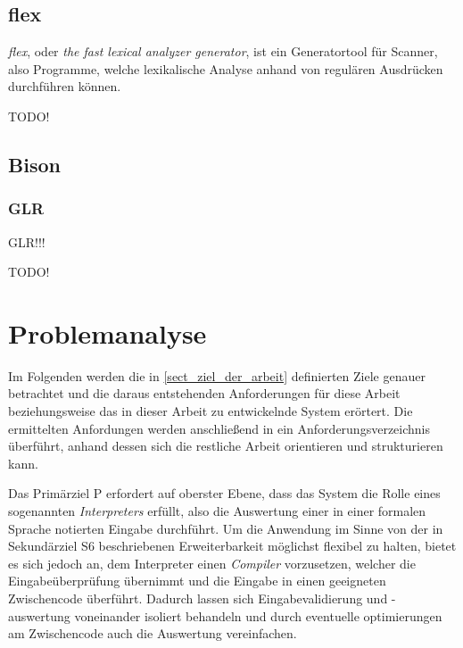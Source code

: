 \documentclass[oneside]{ausarbeitung}
\begin{document}
	\section{flex}
	
	\textit{flex}, oder \textit{the fast lexical analyzer generator}, ist ein Generatortool für Scanner, also Programme, welche lexikalische Analyse anhand von regulären Ausdrücken durchführen können. 
	
	TODO!
	
	
	\section{Bison}
	
	\subsection{GLR}
	
	
	GLR!!!
	
	TODO!

	
	
	
	
	\chapter{Problemanalyse}
	\label{chapt_problemanalyse}
	
	Im Folgenden werden die in \ref{sect_ziel_der_arbeit} definierten Ziele genauer betrachtet und die daraus entstehenden Anforderungen für diese Arbeit beziehungsweise das in dieser Arbeit zu entwickelnde System erörtert. Die ermittelten Anfordungen werden anschließend in ein Anforderungsverzeichnis überführt, anhand dessen sich die restliche Arbeit orientieren und strukturieren kann.
	
	Das Primärziel P erfordert auf oberster Ebene, dass das System die Rolle eines sogenannten \textit{Interpreters} erfüllt, also die Auswertung einer in einer formalen Sprache notierten Eingabe durchführt. Um die Anwendung im Sinne von der in Sekundärziel S6 beschriebenen Erweiterbarkeit möglichst flexibel zu halten, bietet es sich jedoch an, dem Interpreter einen \textit{Compiler} vorzusetzen, welcher die Eingabeüberprüfung übernimmt und die Eingabe in einen geeigneten Zwischencode überführt. Dadurch lassen sich Eingabevalidierung und -auswertung voneinander isoliert behandeln und durch eventuelle optimierungen am Zwischencode auch die Auswertung vereinfachen.
	
\end{document}
